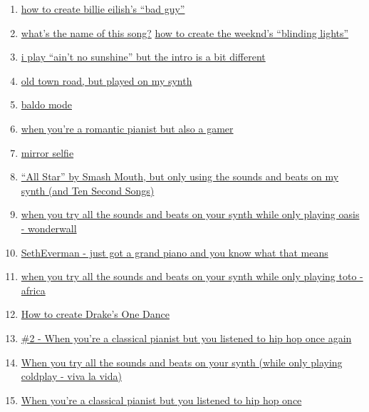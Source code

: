 \documentclass{book}
\numberwithin{equation}{section}
\begin{document}
\begin{enumerate}
    \item \href{https://www.youtube.com/watch?v=VSPuRXkUWoU}{how to create billie eilish's ``bad guy''}
    \item \href{https://www.youtube.com/watch?v=FoSe_KAQEr8}{what's the name of this song?}
    \href{https://www.youtube.com/watch?v=5lycM4LF7DM}{how to create the weeknd's ``blinding lights''}
    \item \href{https://www.youtube.com/watch?v=2tN1OI0e280}{i play ``ain't no sunshine'' but the intro is a bit different}
    \item \href{https://www.youtube.com/watch?v=lzciXblJOkk}{old town road, but played on my synth}
    \item \href{https://www.youtube.com/watch?v=wBBOcCe9Mak}{baldo mode}
    \item \href{https://www.youtube.com/watch?v=oOnp5LI2b0c}{when you're a romantic pianist but also a gamer}
    \item \href{https://www.youtube.com/watch?v=xCY9B8POq3A}{mirror selfie}
    \item \href{https://www.youtube.com/watch?v=y4nn8o7oBzk}{``All Star'' by Smash Mouth, but only using the sounds and beats on my synth (and Ten Second Songs)}
    \item \href{https://www.youtube.com/watch?v=OjmcKNa3w40}{when you try all the sounds and beats on your synth while only playing oasis - wonderwall}
    \item \href{https://www.youtube.com/watch?v=Xrbqsk-21wQ}{SethEverman - just got a grand piano and you know what that means}
    \item \href{https://www.youtube.com/watch?v=8jafRIOpxoc}{when you try all the sounds and beats on your synth while only playing toto - africa}
    \item \href{https://www.youtube.com/watch?v=aLX6I4Q79q8}{How to create Drake's One Dance}
    \item \href{https://www.youtube.com/watch?v=dWhid0YvFGo}{\#2 - When you're a classical pianist but you listened to hip hop once again}
    \item \href{https://www.youtube.com/watch?v=NZVCoSbCtY0}{When you try all the sounds and beats on your synth (while only playing coldplay - viva la vida)}
    \item \href{https://www.youtube.com/watch?v=GMbn7JY9D1U}{When you're a classical pianist but you listened to hip hop once}
\end{enumerate}
\end{document}
